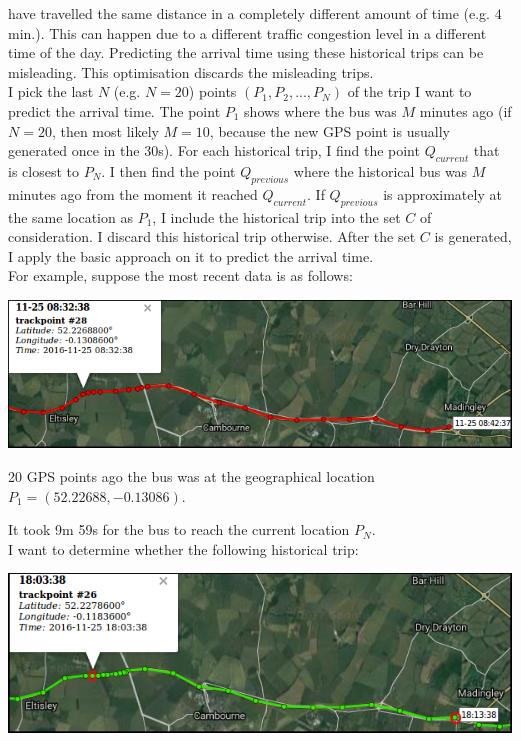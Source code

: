 \documentclass[12pt,a4paper,oneside,openright]{report}
\begin{document}
have travelled the same distance in a completely different amount of 
time (e.g. $4$ min.). This can happen due to a different traffic congestion level
in a different time of the day. Predicting the arrival time using
these historical trips can be misleading. This optimisation discards the misleading
trips. \\

I pick the last $N$ (e.g. $N = 20$) points $(P_1, P_2, ..., P_N)$ of the trip I want to predict
the arrival time. The point $P_1$ shows where the bus was $M$ minutes
ago (if $N=20$, then most likely $M=10$, because the new GPS point is usually generated once in the 
30s). For each historical trip, I find the point $Q_{current}$ that is closest to $P_{N}$.
I then find the point $Q_{previous}$ where the historical bus was $M$ minutes
ago from the moment it reached $Q_{current}$. If $Q_{previous}$ is approximately at the same location
as $P_{1}$, I include the historical trip into the set $C$ of consideration.
I discard this historical trip otherwise. After the set $C$ is generated, I apply the basic
approach on it to predict the arrival time. \\

For example, suppose the most recent data is as follows:

\includegraphics[width=\textwidth]{figs/optimisation_match1.png}

20 GPS points ago the bus was at the geographical location $P_1 = (52.22688, -0.13086)$.

It took 9m 59s for the bus to reach the current location $P_N$. \\

I want to determine whether the following historical trip:

\includegraphics[width=\textwidth]{figs/optimisation_match2.png}
\end{document}
